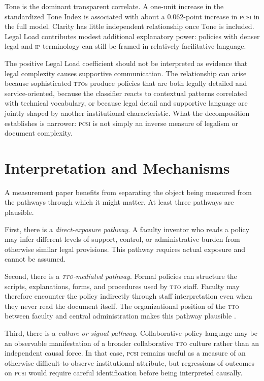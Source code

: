 \documentclass[12pt]{article}
\newcommand{\PCSI}{\textsc{pcsi}}
\newcommand{\IP}{\textsc{ip}}
\newcommand{\TTO}{\textsc{tto}}
\begin{document}
Tone is the dominant transparent correlate. A one-unit increase in the standardized Tone Index is associated with about a 0.062-point increase in \PCSI{} in the full model. Clarity has little independent relationship once Tone is included. Legal Load contributes modest additional explanatory power: policies with denser legal and \IP{} terminology can still be framed in relatively facilitative language.

The positive Legal Load coefficient should not be interpreted as evidence that legal complexity causes supportive communication. The relationship can arise because sophisticated \TTO{}s produce policies that are both legally detailed and service-oriented, because the classifier reacts to contextual patterns correlated with technical vocabulary, or because legal detail and supportive language are jointly shaped by another institutional characteristic. What the decomposition establishes is narrower: \PCSI{} is not simply an inverse measure of legalism or document complexity.

\section{Interpretation and Mechanisms}

A measurement paper benefits from separating the object being measured from the pathways through which it might matter. At least three pathways are plausible.

First, there is a \emph{direct-exposure pathway}. A faculty inventor who reads a policy may infer different levels of support, control, or administrative burden from otherwise similar legal provisions. This pathway requires actual exposure and cannot be assumed.

Second, there is a \emph{\TTO-mediated pathway}. Formal policies can structure the scripts, explanations, forms, and procedures used by \TTO{} staff. Faculty may therefore encounter the policy indirectly through staff interpretation even when they never read the document itself. The organizational position of the \TTO{} between faculty and central administration makes this pathway plausible \citep{Jensen2003}.

Third, there is a \emph{culture or signal pathway}. Collaborative policy language may be an observable manifestation of a broader collaborative \TTO{} culture rather than an independent causal force. In that case, \PCSI{} remains useful as a measure of an otherwise difficult-to-observe institutional attribute, but regressions of outcomes on \PCSI{} would require careful identification before being interpreted causally.
\end{document}
